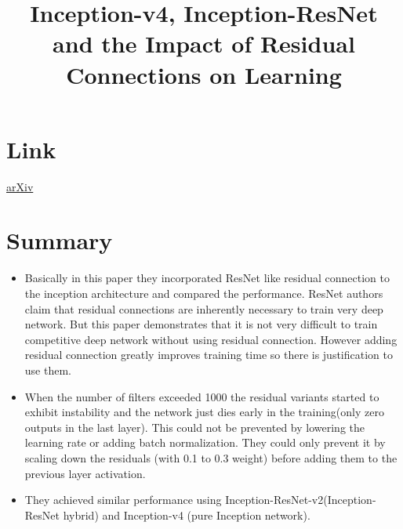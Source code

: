\documentclass{article}
\title{Inception-v4, Inception-ResNet and the Impact of Residual Connections on Learning}
\author{}
\date{}
\begin{document}
\maketitle

\section*{Link}
\href{https://arxiv.org/abs/1602.07261}{arXiv} 

\section*{Summary}
\begin{itemize}
	\item Basically in this paper they incorporated ResNet like residual connection to the inception architecture and compared the performance. ResNet authors claim that residual connections are inherently necessary to train very deep network. But this paper demonstrates that it is not very difficult to train competitive deep network without using residual connection. However adding residual connection greatly improves training time so there is justification to use them.
	\item When the number of filters exceeded 1000 the residual variants started to exhibit instability and the network just dies early in the training(only zero outputs in the last layer). This could not be prevented by lowering the learning rate or adding batch normalization. They could only prevent it by scaling down the residuals (with 0.1 to 0.3 weight) before adding them to the previous layer activation.
    \item They achieved similar performance using Inception-ResNet-v2(Inception-ResNet hybrid) and Inception-v4 (pure Inception network).
\end{itemize}
\end{document}

